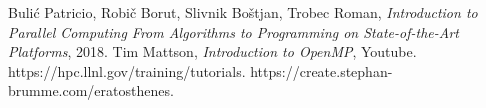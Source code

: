 \documentclass[12pt,a4paper]{report}
\begin{document}
\begin{thebibliography}{99}               %

 Bulić Patricio, Robič Borut, Slivnik Boštjan, Trobec Roman, {\it Introduction to Parallel Computing From Algorithms to Programming on State-of-the-Art Platforms}, 2018.
 Tim Mattson, {\it Introduction to OpenMP}, Youtube.
 https://hpc.llnl.gov/training/tutorials.
 https://create.stephan-brumme.com/eratosthenes.

\end{thebibliography}
\end{document}

